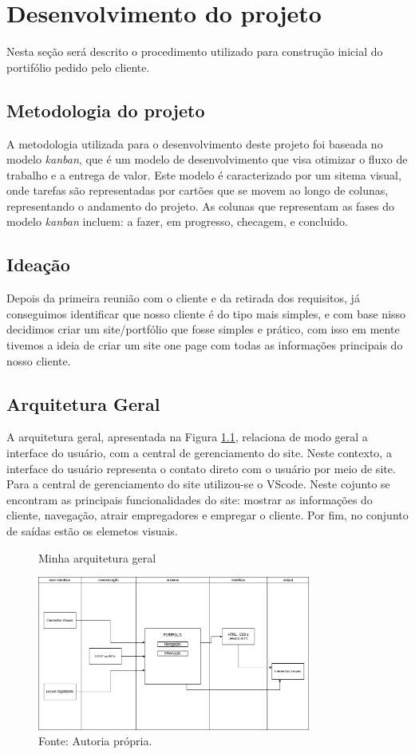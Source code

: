 \chapter{Desenvolvimento do projeto}
\label{chap:metod}
Nesta seção será descrito o procedimento utilizado para construção inicial do portifólio pedido pelo cliente.
\section{Metodologia do projeto}
A metodologia utilizada para o desenvolvimento deste projeto foi baseada no modelo \textit{kanban}, que é um modelo de desenvolvimento que visa otimizar o fluxo de trabalho e a entrega de valor. Este modelo é caracterizado por um sitema visual, onde tarefas são representadas por cartões que se movem ao longo de colunas, representando o andamento do projeto. As colunas que representam as fases do modelo \textit{kanban} incluem: a fazer, em progresso, checagem, e concluido.

\section{Ideação}
  Depois da primeira reunião com o cliente e da retirada dos requisitos, já conseguimos identificar que nosso cliente é do tipo mais simples, e com base nisso decidimos criar um site/portfólio que fosse simples e prático, com isso em mente tivemos a ideia de criar um site one page com todas as informações principais do nosso cliente.

\section{Arquitetura Geral}
 A arquitetura geral, apresentada na Figura \ref{fig:arquitetura_geral}, relaciona de modo geral a interface do usuário, com a central de gerenciamento do site. Neste contexto, a interface do usuário representa o contato direto com o usuário por meio de site.
Para a central de gerenciamento do site utilizou-se o VScode. Neste cojunto se encontram as principais funcionalidades do site: mostrar as informações do cliente, navegação, atrair empregadores e empregar o cliente. Por fim, no conjunto de saídas estão os elemetos visuais.
\begin{figure} [h!]	
    \centering
    \caption{Minha arquitetura geral}
    \includegraphics[width=0.8\textwidth]{Figures/arquitetura-solução.png}
    \caption*{Fonte: Autoria própria.}
    \label{fig:arquitetura_geral}
\end{figure}

